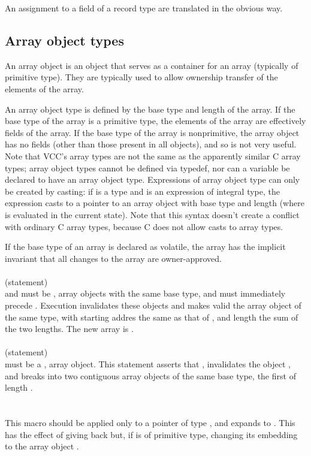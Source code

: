 \documentclass[preprint,nocopyrightspace]{sigplanconf}
\begin{document}
{{{{An assignment to a field of a record type are translated in the
obvious way.


\subsection{Array object types}
An array object is an object that serves as a container for an array
(typically of primitive type). They are typically used to allow
ownership transfer of the elements of the array.

An array  object type is  defined by the  base type and length  of the
array. If the base type of the array is a primitive type, the elements
of the array are effectively fields  of the array. If the base type of
the array is nonprimitive, the  array object has no fields (other than
those present  in all objects), and  so is not very  useful. Note that
VCC's array types  are not the same as the  apparently similar C array
types; array  object types  cannot be defined  via typedef, nor  can a
variable  be declared  to have  an array  object type.  Expressions of
array object type can only be created by casting: if  is a type
and       is    an   expression    of   integral    type,   the
expression    casts   to  a pointer  to an  array
object with  base type   and length   (where   is
evaluated in the current state).  Note that this syntax doesn't create
a conflict with ordinary C array types, because C does not allow casts
to array types.

If the base type of an array is declared as volatile, the array has
the implicit invariant that all changes to the array are
owner-approved.
\\\\
 (statement)\\
 and  must be \vcc{\mutable}, \vcc{\writable} array objects with the same
base type, and  must immediately precede . Execution 
invalidates these objects and makes valid the array object of the same
type, with starting addres the same as that of , and length
the sum of the two lengths. The new array is \vcc{\mutable}.
\\\\
 (statement)\\
 must be a \vcc{\mutable}, \vcc{\writable} array object. This
statement asserts that , invalidates the
object , and breaks  into two \vcc{\mutable} contiguous array
objects of the same base type, the first of length .
\\\\
\\
This macro should be applied only to a pointer  of type , and
expands to . This has the effect of giving
back  but, if  is of primitive type, changing its
embedding to the array object . 

}}}}
\end{document}
